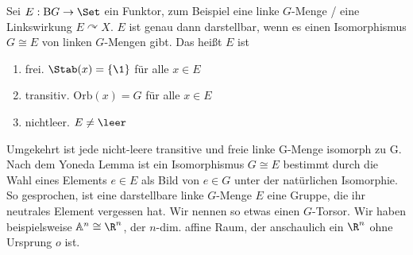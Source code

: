 \documentclass[11pt]{article}
\begin{document}
\begin{example}  Sei $E: \mathrm B G \to \Set$ ein Funktor, zum Beispiel eine linke $G$-Menge / eine Linkswirkung $E\curvearrowright X$. $E$ ist genau dann darstellbar, wenn es einen Isomorphismus $G\cong E$ von linken $G$-Mengen gibt. Das heißt $E$ ist
\begin{enumerate}
    \item frei. $\Stab(x) = \{\1\}$ für alle $x\in E$
    \item transitiv. $\mathrm{Orb}(x) = G$ für alle $x\in E$
    \item nichtleer. $E \neq \leer$
\end{enumerate}
Umgekehrt ist jede nicht-leere transitive und freie linke G-Menge isomorph zu G. Nach dem Yoneda Lemma ist ein Isomorphismus $G\cong E$ bestimmt durch die Wahl eines Elements $e\in E$ als Bild von $e\in G$ unter der natürlichen Isomorphie. So gesprochen, ist eine darstellbare linke $G$-Menge $E$ eine Gruppe, die ihr neutrales Element vergessen hat. Wir nennen so etwas einen $G$-Torsor. Wir haben beispielsweise $\mathbb A^n \cong \R^n$, der $n$-dim. affine Raum, der anschaulich ein $\R^n$ ohne Ursprung $o$ ist.
\end{example}
\end{document}

